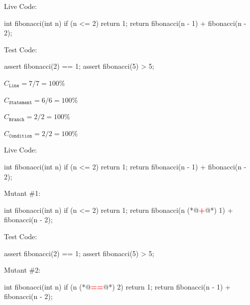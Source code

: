 \documentclass{article}
\begin{document}

\begin{multicols}{2}
Live Code:\par
{\small\begin{ffcode}
int fibonacci(int n) {
  if (n <= 2) {
    return 1;
  }
  return fibonacci(n - 1)
    + fibonacci(n - 2);
}
\end{ffcode}
}
\par\columnbreak\par
Test Code:\par
{\small\begin{ffcode}
assert fibonacci(2) == 1;
assert fibonacci(5) > 5;
\end{ffcode}
}
\( C_{\texttt{Line}} = 7/7 = 100\% \)\par
\( C_{\texttt{Statement}} = 6/6 = 100\% \)\par
\( C_{\texttt{Branch}} = 2/2 = 100\% \)\par
\( C_{\texttt{Condition}} = 2/2 = 100\% \)\par
\end{multicols}
\plush{}

\begin{pptWide}{3}
Live Code:\par
{\small\begin{ffcode}
int fibonacci(int n) {
  if (n <= 2) {
    return 1;
  }
  return fibonacci(n - 1)
    + fibonacci(n - 2);
}
\end{ffcode}
}
\par\columnbreak\par
Mutant \#1:\par
{\small\begin{ffcode}
int fibonacci(int n) {
  if (n <= 2) {
    return 1;
  }
  return fibonacci(n (*@\textcolor{red}{\textbf{+}}@*) 1)
    + fibonacci(n - 2);
}
\end{ffcode}
}
\par
Test Code:\par
{\small\begin{ffcode}
assert fibonacci(2) == 1;
assert fibonacci(5) > 5;
\end{ffcode}
}
\par\columnbreak\par
Mutant \#2:\par
{\small\begin{ffcode}
int fibonacci(int n) {
  if (n (*@\textcolor{red}{\textbf{==}}@*) 2) {
    return 1;
  }
  return fibonacci(n - 1)
    + fibonacci(n - 2);
}
\end{ffcode}
}
\end{pptWide}
\plush{}
\end{document}

